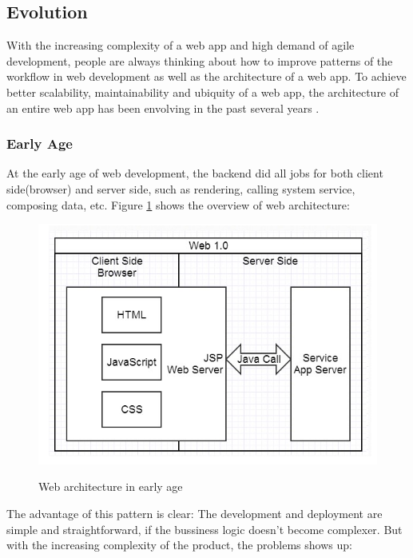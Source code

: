 

\subsection{Evolution}
With the increasing complexity of a web app and high demand of agile development, people are always thinking about how to improve patterns of the workflow in web development as well as the architecture of a web app. To achieve better scalability, maintainability and ubiquity of a web app, the architecture of an entire web app has been envolving in the past several years .

\subsubsection{Early Age}
At the early age of web development, the backend did all jobs for both client side(browser) and server side, such as rendering, calling system service, composing data, etc. Figure \ref{fig:3.1} shows the overview of web architecture:
\begin{figure}[!htbp]
  \caption{Web architecture in early age}
  \centering
    \includegraphics[width=1\textwidth]{Figures/3_1.png}
  \label{fig:3.1}
\end{figure}
The advantage of this pattern is clear: The development and deployment are simple and straightforward, if the bussiness logic doesn't become complexer. But with the increasing complexity of the product, the problems shows up:
